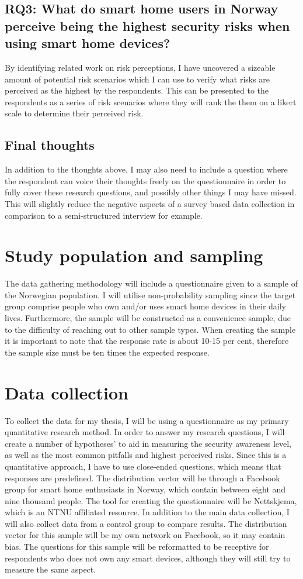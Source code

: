 \subsection*{RQ3: What do smart home users in Norway perceive being the highest security risks when using smart home devices?}
By identifying related work on risk perceptions, I have uncovered a sizeable amount of potential risk scenarios which I can use to verify what risks are perceived as the highest by the respondents. This can be presented to the respondents as a series of risk scenarios where they will rank the them on a likert scale to determine their perceived risk. 

\subsection*{Final thoughts}
In addition to the thoughts above, I may also need to include a question where the respondent can voice their thoughts freely on the questionnaire in order to fully cover these research questions, and possibly other things I may have missed. This will slightly reduce the negative aspects of a survey based data collection in comparison to a semi-structured interview for example. 

\section{Study population and sampling}
The data gathering methodology will include a questionnaire given to a sample of the Norwegian population. I will utilise non-probability sampling since the target group comprise people who own and/or uses smart home devices in their daily lives. Furthermore, the sample will be constructed as a convenience sample, due to the difficulty of reaching out to other sample types. When creating the sample it is important to note that the response rate is about 10-15 per cent, therefore the sample size must be ten times the expected response. 

\section{Data collection}
To collect the data for my thesis, I will be using a questionnaire as my primary quantitative research method. 
In order to answer my research questions, I will create a number of hypotheses' to aid in measuring the security awareness level, as well as the most common pitfalls and highest perceived risks. Since this is a quantitative approach, I have to use close-ended questions, which means that responses are predefined. The distribution vector will be through a Facebook group for smart home enthusiasts in Norway, which contain between eight and nine thousand people. The tool for creating the questionnaire will be Nettskjema, which is an NTNU affiliated resource. In addition to the main data collection, I will also collect data from a control group to compare results. The distribution vector for this sample will be my own network on Facebook, so it may contain bias. The questions for this sample will be reformatted to be receptive for respondents who does not own any smart devices, although they will still try to measure the same aspect.

